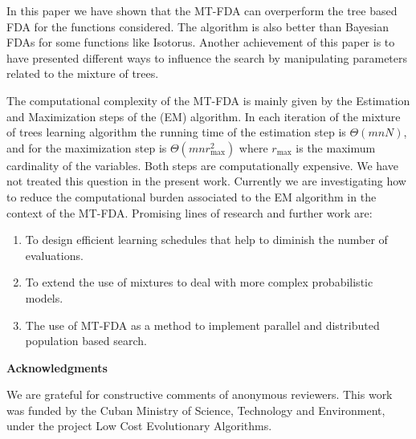 \documentclass[10pt,thmsa]{article}
\begin{document}
In this paper we have shown that the MT-FDA can overperform the tree based
FDA for the functions considered. The algorithm is also better than Bayesian
FDAs for some functions like Isotorus. Another achievement of this paper is
to have presented different ways to influence the search by manipulating
parameters related to the mixture of trees.

The computational complexity of the MT-FDA is mainly given by the Estimation
and Maximization steps of the (EM) algorithm. In each iteration of the
mixture of trees learning algorithm the running time of the estimation step
is $\Theta (mnN)$, and for the maximization step is $\Theta (mnr_{\max }^2)$
where $r_{\max }^{}$ is the maximum cardinality of the variables. Both steps
are computationally expensive. We have not treated this question in the
present work. Currently we are investigating how to reduce the computational
burden associated to the EM algorithm in the context of the MT-FDA.
Promising lines of research and further work are:

\begin{enumerate}
\item  To design efficient learning schedules that help to diminish the
number of evaluations.

\item  To extend the use of mixtures to deal with more complex probabilistic
models.

\item  The use of MT-FDA as a method to implement parallel and distributed
population based search.
\end{enumerate}

\newpage \textbf{Acknowledgments}

We are grateful for constructive comments of anonymous reviewers. This work
was funded by the Cuban Ministry of Science, Technology and Environment,
under the project Low Cost Evolutionary Algorithms.



\end{document}
